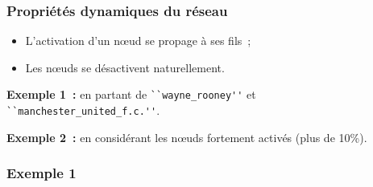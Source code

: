 \documentclass[12pt, handout]{beamer}
\begin{document}
\begin{frame}[fragile]
 \frametitle{Propriétés dynamiques du réseau}
 
 \begin{itemize}
  \item  L'activation d'un n\oe{}ud se propage à ses fils~;
  \item Les n\oe{}uds se désactivent naturellement.
 \end{itemize}
 
 \textbf{Exemple 1~:} en partant de \verb|``wayne_rooney''| et  \verb|``manchester_united_f.c.''|.
 
 \textbf{Exemple 2~:} en considérant les n\oe{}uds fortement activés (plus de 10\%).
 
 
\end{frame}


\begin{frame}
  \frametitle{Exemple 1}
% 
%   

\end{frame}
\end{document}
